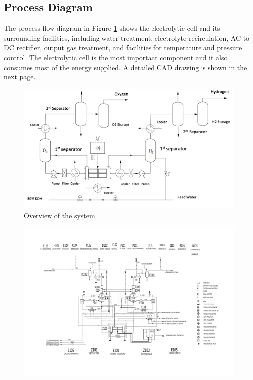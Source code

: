 \subsection{Process Diagram} 
The process flow diagram in Figure \ref{fig:overview} shows the electrolytic cell and its surrounding facilities, including water treatment, electrolyte recirculation, AC to DC rectifier, output gas treatment, and facilities for temperature and pressure control. The electrolytic cell is the most important component and it also consumes most of the energy supplied. A detailed CAD drawing is shown in the next page.

\begin{figure}[H]
\centering
\includegraphics[width= 10 cm] {overview.png} 
\caption{Overview of the system} \label{fig:overview}
\end{figure}  

\begin{figure}[H]
\centering
\includegraphics[width= 25 cm, angle=90] {cadcad.pdf}
\end{figure}

%

